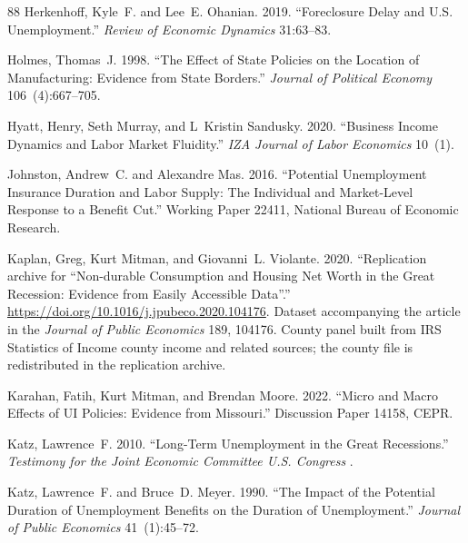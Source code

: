 \documentclass[12pt]{article}
\newcommand{\1}{\mathbf{1}}
\begin{document}
\begin{thebibliography}{88}
Herkenhoff, Kyle~F. and Lee~E. Ohanian. 2019.
\newblock \enquote{Foreclosure Delay and U.S. Unemployment.}
\newblock \emph{Review of Economic Dynamics} 31:63--83.

Holmes, Thomas~J. 1998.
\newblock \enquote{The Effect of State Policies on the Location of Manufacturing: Evidence from State Borders.}
\newblock \emph{Journal of Political Economy} 106~(4):667--705.

Hyatt, Henry, Seth Murray, and L~Kristin Sandusky. 2020.
\newblock \enquote{Business Income Dynamics and Labor Market Fluidity.}
\newblock \emph{IZA Journal of Labor Economics} 10~(1).

Johnston, Andrew~C. and Alexandre Mas. 2016.
\newblock \enquote{Potential Unemployment Insurance Duration and Labor Supply: The Individual and Market-Level Response to a Benefit Cut.}
\newblock Working Paper 22411, National Bureau of Economic Research.

Kaplan, Greg, Kurt Mitman, and Giovanni~L. Violante. 2020.
\newblock \enquote{Replication archive for ``Non-durable Consumption and Housing Net Worth in the {G}reat {R}ecession: Evidence from Easily Accessible Data''.}
\newblock \urlprefix\url{https://doi.org/10.1016/j.jpubeco.2020.104176}.
\newblock Dataset accompanying the article in the \emph{Journal of Public Economics} 189, 104176. County panel built from {IRS} Statistics of Income county income and related sources; the county file is redistributed in the replication archive.

Karahan, Fatih, Kurt Mitman, and Brendan Moore. 2022.
\newblock \enquote{Micro and Macro Effects of UI Policies: Evidence from Missouri.}
\newblock Discussion Paper 14158, CEPR.

Katz, Lawrence~F. 2010.
\newblock \enquote{Long-Term Unemployment in the Great Recessions.}
\newblock \emph{Testimony for the Joint Economic Committee U.S. Congress} .

Katz, Lawrence~F. and Bruce~D. Meyer. 1990.
\newblock \enquote{The Impact of the Potential Duration of Unemployment Benefits on the Duration of Unemployment.}
\newblock \emph{Journal of Public Economics} 41~(1):45--72.


\end{thebibliography}
\end{document}
